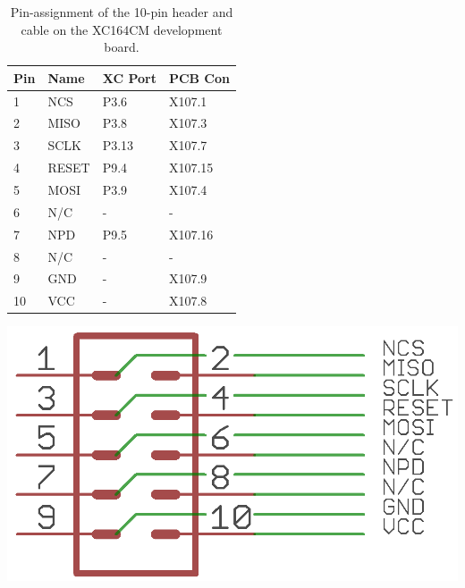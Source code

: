 \documentclass[12pt,a4paper]{article}
\begin{document}
\begin{table}[htbp]
  \begin{minipage}{0.55\textwidth}
    \centering
    \begin{tabular}{|l|l|l|l|}
       \hline
       Pin & Name & XC Port & PCB Con\\
       \hline
       1    & NCS   & P3.6  & X107.1     \\
       2    & MISO  & P3.8  & X107.3     \\
       3    & SCLK  & P3.13 & X107.7     \\
       4    & RESET & P9.4  & X107.15    \\
       5    & MOSI  & P3.9  & X107.4     \\
       6    & N/C   & -     & -          \\
       7    & NPD   & P9.5  & X107.16    \\
       8    & N/C   & -     & -          \\
       9    & GND   & -     & X107.9     \\
       10   & VCC   & -     & X107.8     \\
       \hline
    \end{tabular}
  \end{minipage}\hfill
  \begin{minipage}{0.45\textwidth}
    \centering
    \includegraphics[width=1\textwidth]{figures/header.png}
  \end{minipage}
  \caption{Pin-assignment of the 10-pin header and cable on the XC164CM development board.}
  \label{pin-table}
\end{table}
\end{document}
